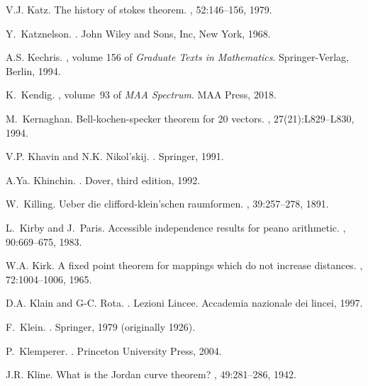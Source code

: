 \documentclass[12pt]{amsart}
\begin{document}
\begin{thebibliography}{100}
V.J. Katz.
\newblock The history of stokes theorem.
, 52:146--156, 1979.

Y.~Katznelson.
.
\newblock John Wiley and Sons, Inc, New York, 1968.

A.S. Kechris.
, volume 156 of {\em Graduate
  Texts in Mathematics}.
\newblock Springer-Verlag, Berlin, 1994.

K.~Kendig.
,
  volume~93 of {\em MAA Spectrum}.
\newblock MAA Press, 2018.

M.~Kernaghan.
\newblock Bell-kochen-specker theorem for 20 vectors.
,
  27(21):L829--L830, 1994.

V.P. Khavin and N.K. Nikol'skij.
.
\newblock Springer, 1991.

A.Ya. Khinchin.
.
\newblock Dover, third edition, 1992.

W.~Killing.
\newblock Ueber die clifford-klein'schen raumformen.
, 39:257--278, 1891.

L.~Kirby and J.~Paris.
\newblock Accessible independence results for peano arithmetic.
, 90:669--675, 1983.

W.A. Kirk.
\newblock A fixed point theorem for mappings which do not increase distances.
, 72:1004--1006, 1965.

D.A. Klain and G-C. Rota.
.
\newblock Lezioni Lincee. Accademia nazionale dei lincei, 1997.

F.~Klein.
.
\newblock Springer, 1979 (originally 1926).

P.~Klemperer.
.
\newblock Princeton University Press, 2004.

J.R. Kline.
\newblock What is the {J}ordan curve theorem?
, 49:281--286, 1942.


\end{thebibliography}
\end{document}
